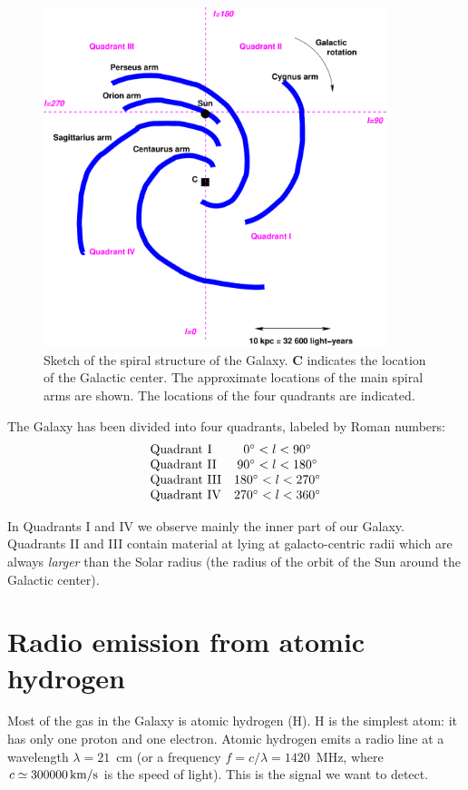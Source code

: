 \begin{figure}[ht]
\begin{center}
\includegraphics[width=10cm]{../figures/mwsketch.pdf}
\end{center}
\caption{Sketch of the spiral structure of the Galaxy. 
{\bf C} indicates the location of the Galactic center. 
The
approximate locations of the main spiral arms are shown. The
locations of the four quadrants are indicated.}
\label{figmwsketch}
\end{figure}  

The Galaxy has been divided into four quadrants, labeled by 
Roman numbers: 
\bigskip
\begin{displaymath}
\begin{array}{lc}
\hbox{Quadrant {\sc I}} 	&0\deg < l < 90\deg	\\
\hbox{Quadrant ${\rm II}$} 	&90\deg < l < 180\deg	\\
\hbox{Quadrant ${\rm III}$} 	&180\deg < l < 270\deg	\\
\hbox{Quadrant ${\rm IV}$} 	&270\deg < l < 360\deg 
\end{array}
\end{displaymath}
\bigskip

In Quadrants I and IV we observe mainly the inner part of our Galaxy. Quadrants
II and III contain material at lying  at galacto-centric radii which are always
{\it larger} than the Solar radius (the radius of the orbit of the Sun around
the Galactic center).

\section{Radio emission from atomic hydrogen}
Most of the gas in the Galaxy is atomic hydrogen (H).  H is the simplest atom:
it has only one proton and one electron.  Atomic hydrogen emits a radio line at
a wavelength $\lambda= 21$~cm (or a frequency $f=c/\lambda=1420$~MHz, where
$c\simeq 300 000\, {\rm km/s}$ is the speed of light).  This is the signal we
want to detect. 

